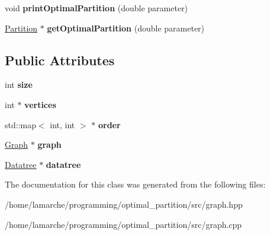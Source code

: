 \begin{DoxyCompactItemize}
\item 
\hypertarget{classGraphComponent_af642a5a15cdbd4c07daea39fafdc9fb1}{void {\bfseries print\-Optimal\-Partition} (double parameter)}\label{classGraphComponent_af642a5a15cdbd4c07daea39fafdc9fb1}

\item 
\hypertarget{classGraphComponent_abed6e50213ba351bb2d0d155710e8be4}{\hyperlink{classPartition}{Partition} $\ast$ {\bfseries get\-Optimal\-Partition} (double parameter)}\label{classGraphComponent_abed6e50213ba351bb2d0d155710e8be4}

\end{DoxyCompactItemize}
\subsection*{Public Attributes}
\begin{DoxyCompactItemize}
\item 
\hypertarget{classGraphComponent_a3624962766b1475e0a93fdd47e7f736c}{int {\bfseries size}}\label{classGraphComponent_a3624962766b1475e0a93fdd47e7f736c}

\item 
\hypertarget{classGraphComponent_add037336c58d88b648e63f2532e2506b}{int $\ast$ {\bfseries vertices}}\label{classGraphComponent_add037336c58d88b648e63f2532e2506b}

\item 
\hypertarget{classGraphComponent_a4a3df3b388cb8fb288e74029ab7a0806}{std\-::map$<$ int, int $>$ $\ast$ {\bfseries order}}\label{classGraphComponent_a4a3df3b388cb8fb288e74029ab7a0806}

\item 
\hypertarget{classGraphComponent_ac12552650f43a1e2d13ddab6ce42ee75}{\hyperlink{classGraph}{Graph} $\ast$ {\bfseries graph}}\label{classGraphComponent_ac12552650f43a1e2d13ddab6ce42ee75}

\item 
\hypertarget{classGraphComponent_a53b6f7f9857c4cbf3232ec04d2b2d6ce}{\hyperlink{classDatatree}{Datatree} $\ast$ {\bfseries datatree}}\label{classGraphComponent_a53b6f7f9857c4cbf3232ec04d2b2d6ce}

\end{DoxyCompactItemize}


The documentation for this class was generated from the following files\-:\begin{DoxyCompactItemize}
\item 
/home/lamarche/programming/optimal\-\_\-partition/src/graph.\-hpp\item 
/home/lamarche/programming/optimal\-\_\-partition/src/graph.\-cpp\end{DoxyCompactItemize}

